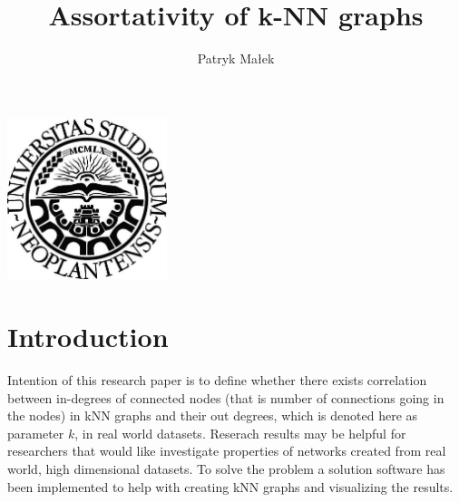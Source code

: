 \documentclass[a4paper,11pt]{article}
\newcommand{\mahtitle}{Assortativity of k-NN graphs}
\begin{document}
\label{Title} 
\title{\vspace{1pc} \mahtitle \vspace{4pc}}
\author{Patryk Małek \vspace{-0.7pc}}
\date{}
\maketitle
\thispagestyle{empty}

\vspace{6pc}
\centerline{
\includegraphics[width=0.35\textwidth,height=0.35\textheight,keepaspectratio]{NoviSadLogoGray.jpg}
}
\vspace{8pc}

\clearpage
\begin{abstract}
\label{Abstract}

\end{abstract}


\clearpage
\tableofcontents


\clearpage
\section{Introduction} 
Intention of this research paper is to define whether there exists correlation between in-degrees of connected nodes (that is number of connections going in the nodes) in kNN graphs and their out degrees, which is denoted here as parameter $k$, in real world datasets.
Reserach results may be helpful for researchers that would like investigate properties of networks created from real world, high dimensional datasets.
To solve the problem a solution software has been implemented to help with creating kNN graphs and visualizing the results.

\end{document}
